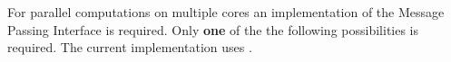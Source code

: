 % 
%               
%          
% 


For parallel computations on multiple cores an implementation of the Message Passing Interface is required. Only \textbf{one} of the the following possibilities is required. The current implementation uses \marktool{\openmpiname}.



